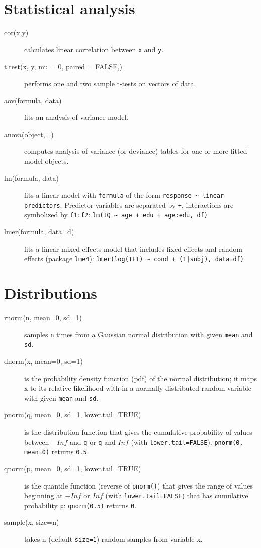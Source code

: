 \documentclass[a4paper,9pt]{extarticle}
\begin{document}
\begin{multicols}{3}
\section{Statistical analysis}
\begin{description}
\item[cor(x,y)] calculates linear correlation between \texttt{x} and \texttt{y}.
\item[t.test(x, y, mu = 0, paired = FALSE,)] performs one and two sample t-tests on vectors of data.
\item[aov(formula, data)] fits an analysis of variance model.
\item[anova(object,...)] computes analysis of variance (or deviance) tables for one or more fitted model objects.
\item[lm(formula, data)] fits a linear model with \texttt{formula} of the form \texttt{response \~{} linear predictors}. Predictor variables are separated by \texttt{+}, interactions are symbolized by \texttt{f1:f2}: \texttt{lm(IQ \~{} age + edu + age:edu, df)}
\item[lmer(formula, data=d)] fits a linear mixed-effects model that includes fixed-effects and random-effects (package \texttt{lme4}): \texttt{lmer(log(TFT) \~{} cond + (1|subj), data=df)}
\end{description}


\section{Distributions}
\begin{description}
\item[rnorm(n, mean=0, sd=1)] samples \texttt{n} times from a Gaussian normal distribution with given \texttt{mean} and \texttt{sd}.
\item[dnorm(x, mean=0, sd=1)] is the probability density function (pdf) of the normal distribution; it maps x to its relative likelihood with in a normally distributed random variable with given \texttt{mean} and \texttt{sd}.
\item[pnorm(q, mean=0, sd=1, lower.tail=TRUE)] is the distribution function that gives the cumulative probability of values between $-Inf$ and \texttt{q} or \texttt{q} and $Inf$ (with \texttt{lower.tail=FALSE}): \texttt{pnorm(0, mean=0)} returns \texttt{0.5}.
\item[qnorm(p, mean=0, sd=1, lower.tail=TRUE)] is the quantile function (reverse of \texttt{pnorm()}) that gives the range of values beginning at $-Inf$ or $Inf$ (with \texttt{lower.tail=FALSE}) that has cumulative probability \texttt{p}: \texttt{qnorm(0.5)} returns \texttt{0}.
\item[sample(x, size=n)] takes n (default \texttt{size=1}) random samples from variable x.
\end{description}



\end{multicols}
\end{document}

